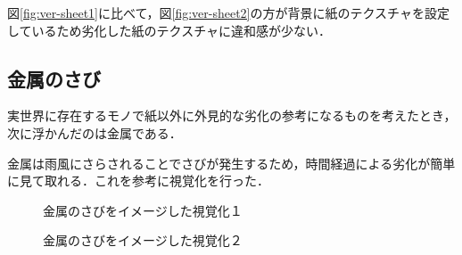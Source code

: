 図\ref{fig:ver-sheet1}に比べて，図\ref{fig:ver-sheet2}の方が背景に紙のテクスチャを設定しているため劣化した紙のテクスチャに違和感が少ない．

\subsection{金属のさび}
\label{subsec:ver-tex-russet}

実世界に存在するモノで紙以外に外見的な劣化の参考になるものを考えたとき，次に浮かんだのは金属である．

金属は雨風にさらされることでさびが発生するため，時間経過による劣化が簡単に見て取れる．これを参考に視覚化を行った．

\begin{figure}[htbp]
  \begin{minipage}{0.5\hsize}
    \begin{center}
    \end{center}
    \caption{金属のさびをイメージした視覚化１}
    \label{fig:ver-russet1}
  \end{minipage}
  \begin{minipage}{0.5\hsize}
    \begin{center}
    \end{center}
    \caption{金属のさびをイメージした視覚化２}
    \label{fig:ver-russet2}
  \end{minipage}
\end{figure}

